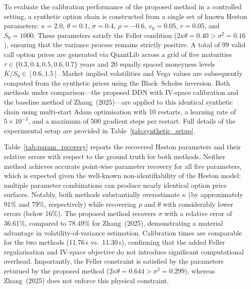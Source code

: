 
To evaluate the calibration performance of the proposed method in a controlled setting, a synthetic option chain is constructed from a single set of known Heston parameters: $\kappa = 2.0$, $\theta = 0.1$, $\sigma = 0.4$, $\rho = -0.6$, $v_0 = 0.05$, $r = 0.05$, and $S_0 = 1000$. These parameters satisfy the Feller condition ($2\kappa\theta = 0.40 > \sigma^2 = 0.16$), ensuring that the variance process remains strictly positive. A total of 99 valid call option prices are generated via QuantLib across a grid of five maturities $\tau \in \{0.3, 0.4, 0.5, 0.6, 0.7\}$ years and 20 equally spaced moneyness levels $K/S_0 \in [0.6, 1.5]$. Market implied volatilities and Vega values are subsequently computed from the synthetic prices using the Black--Scholes inversion. Both methods under comparison---the proposed DDN with IV-space calibration and the baseline method of Zhang~(2025)---are applied to this identical synthetic chain using multi-start Adam optimisation with 10 restarts, a learning rate of $5\times10^{-3}$, and a maximum of 500 gradient steps per restart. Full details of the experimental setup are provided in Table~\ref{tab:synthetic_setup}.

Table~\ref{tab:param_recovery} reports the recovered Heston parameters and their relative errors with respect to the ground truth for both methods. Neither method achieves accurate point-wise parameter recovery for all five parameters, which is expected given the well-known non-identifiability of the Heston model: multiple parameter combinations can produce nearly identical option price surfaces. Notably, both methods substantially overestimate $\kappa$ (by approximately 91\% and 79\%, respectively) while recovering $\rho$ and $\theta$ with considerably lower errors (below 16\%). The proposed method recovers $\sigma$ with a relative error of 36.61\%, compared to 78.49\% for Zhang~(2025), demonstrating a material advantage in volatility-of-variance estimation. Calibration times are comparable for the two methods (11.76\,s vs.\ 11.30\,s), confirming that the added Feller regularisation and IV-space objective do not introduce significant computational overhead. Importantly, the Feller constraint is satisfied by the parameters returned by the proposed method ($2\kappa\theta = 0.644 > \sigma^2 = 0.299$), whereas Zhang~(2025) does not enforce this physical constraint.


